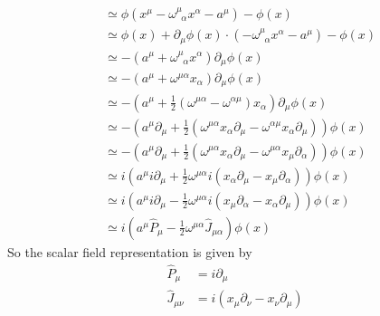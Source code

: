 \documentclass[10pt,a4paper]{report}
\theoremstyle{definition}
\begin{document}
\begin{enumerate}[a)]
\begin{align}
&\simeq\phi(x^\mu-\omega^\mu_{\;\;\alpha}x^\alpha-a^\mu)-\phi(x)\\
&\simeq\phi(x)+\partial_\mu\phi(x)\cdot(-\omega^\mu_{\;\;\alpha}x^\alpha-a^\mu)-\phi(x)\\
&\simeq-(a^\mu+\omega^\mu_{\;\;\alpha}x^\alpha)\partial_\mu\phi(x)\\
&\simeq-(a^\mu+\omega^{\mu\alpha}x_\alpha)\partial_\mu\phi(x)\\
&\simeq-\left(a^\mu+\frac{1}{2}\left(\omega^{\mu\alpha}-\omega^{\alpha\mu}\right)x_\alpha\right)\partial_\mu\phi(x)\\
&\simeq-\left(a^\mu\partial_\mu+\frac{1}{2}\left(\omega^{\mu\alpha}x_\alpha\partial_\mu-\omega^{\alpha\mu}x_\alpha\partial_\mu\right)\right)\phi(x)\\
&\simeq-\left(a^\mu\partial_\mu+\frac{1}{2}\left(\omega^{\mu\alpha}x_\alpha\partial_\mu-\omega^{\mu\alpha}x_\mu\partial_\alpha\right)\right)\phi(x)\\
&\simeq i\left(a^\mu i\partial_\mu+\frac{1}{2}\omega^{\mu\alpha}i\left(x_\alpha\partial_\mu-x_\mu\partial_\alpha\right)\right)\phi(x)\\
&\simeq i\left(a^\mu i\partial_\mu-\frac{1}{2}\omega^{\mu\alpha}i\left(x_\mu\partial_\alpha-x_\alpha\partial_\mu\right)\right)\phi(x)\\
&\simeq i\left(a^\mu \hat{P}_\mu-\frac{1}{2}\omega^{\mu\alpha}\hat{J}_{\mu\alpha}\right)\phi(x)
\end{align}
So the scalar field representation is given by
\begin{align}
\hat{P}_\mu&=i\partial_\mu\\
\hat{J}_{\mu\nu}&=i(x_\mu\partial_\nu-x_\nu\partial_\mu)
\end{align}
\end{enumerate}
\end{document}
